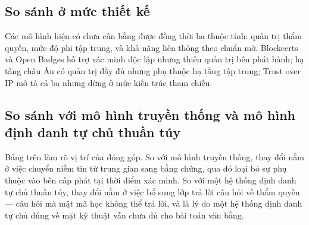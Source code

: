 \subsection{So sánh ở mức thiết kế}



Các mô hình hiện có chưa cân bằng được đồng thời ba thuộc tính: quản trị thẩm quyền, mức độ phi tập trung, và khả năng liên thông theo chuẩn mở. Blockcerts và Open Badges hỗ trợ xác minh độc lập nhưng thiếu quản trị bên phát hành; hạ tầng châu Âu có quản trị đầy đủ nhưng phụ thuộc hạ tầng tập trung; Trust over IP mô tả cả ba nhưng dừng ở mức kiến trúc tham chiếu.

\subsection{So sánh với mô hình truyền thống và mô hình định danh tự chủ thuần túy}



Bảng trên làm rõ vị trí của đóng góp. So với mô hình truyền thống, thay đổi nằm ở việc chuyển niềm tin từ trung gian sang bằng chứng, qua đó loại bỏ sự phụ thuộc vào bên cấp phát tại thời điểm xác minh. So với một hệ thống định danh tự chủ thuần túy, thay đổi nằm ở việc bổ sung lớp trả lời câu hỏi về thẩm quyền --- câu hỏi mà mật mã học không thể trả lời, và là lý do một hệ thống định danh tự chủ đúng về mặt kỹ thuật vẫn chưa đủ cho bài toán văn bằng.
